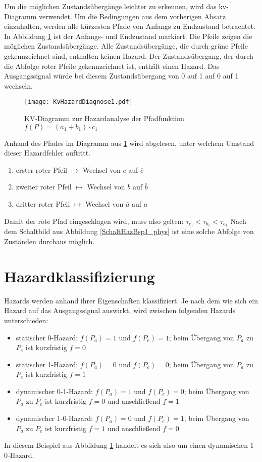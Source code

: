 Um die möglichen Zustandsübergänge leichter zu erkennen, wird das {\sc kv}-Diagramm verwendet. Um die Bedingungen aus dem vorherigen Absatz einzuhalten, werden alle kürzesten Pfade von Anfangs zu Endzustand betrachtet. In Abbildung \ref{KvHazDiag1} ist der Anfangs- und Endzustand markiert. Die Pfeile zeigen die möglichen Zustandsübergänge. Alle Zustandsübergänge, die durch grüne Pfeile gekennzeichnet sind, enthalten keinen Hazard. Der Zustandsübergang, der durch die Abfolge roter Pfeile gekennzeichnet ist, enthält einen Hazard. Das Ausgangssignal würde bei diesem Zustandsübergang von 0 auf 1 auf 0 auf 1 wechseln.
\begin{figure}[htp]
	\centering
	\texttt{[image: KvHazardDiagnose1.pdf]}
	\caption{KV-Diagramm zur Hazardanalyse der Pfadfunktion $f(P) = (a_1 + b_1) \cdot \overline{c_1}$}
	\label{KvHazDiag1}
\end{figure}

Anhand des Pfades im Diagramm aus \ref{KvHazDiag1} wird abgelesen, unter welchem Umstand dieser Hazardfehler auftritt.
\begin{enumerate}
  \item erster roter Pfeil $\mapsto$ Wechsel von $c$ auf $\overline{c}$
  \item zweiter roter Pfeil $\mapsto$ Wechsel von $b$ auf $\overline{b}$ 
  \item dritter roter Pfeil $\mapsto$ Wechsel von $\overline{a}$ auf $a$
\end{enumerate}
Damit der rote Pfad eingeschlagen wird, muss also gelten: $\tau_{c_1} < \tau_{b_1} < \tau_{a_1}$
Nach dem Schaltbild aus Abbildung \ref{SchaltHazBsp1_phys} ist eine solche Abfolge von Zuständen durchaus möglich.

\section{Hazardklassifizierung}
Hazards werden anhand ihrer Eigenschaften klassifiziert. Je nach dem wie sich ein Hazard auf das Ausgangssignal auswirkt, wird zwischen folgenden Hazards unterschieden:
\begin{itemize}
  \item statischer 0-Hazard: $f(P_a) = 1$ und $f(P_e) = 1$; beim Übergang von $P_a$ zu $P_e$ ist kurzfristig $f = 0$
  \item statischer 1-Hazard: $f(P_a) = 0$ und $f(P_e) = 0$; beim Übergang von $P_a$ zu $P_e$ ist kurzfristig $f = 1$
  \item dynamischer 0-1-Hazard: $f(P_a) = 1$ und $f(P_e) = 0$; beim Übergang von $P_a$ zu $P_e$ ist kurzfristig $f = 0$ und anschließend $f = 1$
  \item dynamischer 1-0-Hazard: $f(P_a) = 0$ und $f(P_e) = 1$; beim Übergang von $P_a$ zu $P_e$ ist kurzfristig $f = 1$ und anschließend $f = 0$
\end{itemize}
In diesem Beispiel aus Abbildung \ref{KvHazDiag1} handelt es sich also um einen dynamischen 1-0-Hazard.

